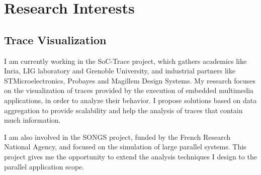 \section{Research Interests}

\subsection{Trace Visualization}

%
{I am currently working in the SoC-Trace project, which gathers academics like 
Inria, LIG 
laboratory and Grenoble University, and industrial partners like 
STMicroelectronics, Probayes and 
Magillem Design Systems. My research focuses on the visualization of traces 
provided by 
the execution of embedded multimedia applications, in order to analyze their 
behavior. I propose solutions based on data aggregation to provide scalability 
and help the analysis of traces that contain much information.}

%
{I am also involved in the SONGS project, funded by the French 
Research National Agency, and focused on the simulation of large parallel 
systems. This project gives me the opportunity to extend the analysis 
techniques I design to the parallel application scope.}